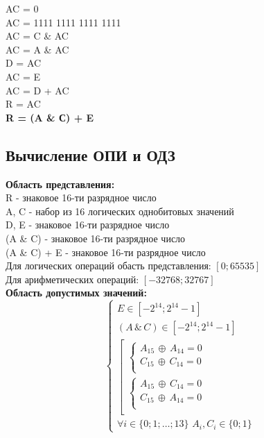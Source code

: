 \noindent AC = 0 \\
AC = 1111 1111 1111 1111 \\
AC = C \& AC \\
AC = A \& AC \\
D = AC \\
AC = E \\
AC = D + AC \\
R = AC \\

\noindent \textbf{R = (A \& С) + E}
\subsection{Вычисление ОПИ и ОДЗ}
\textbf{Область представления:} \\
R - знаковое 16-ти разрядное число \\
A, C - набор из 16 логических однобитовых значений \\
D, E - знаковое 16-ти разрядное число \\
(A \& C) - знаковое 16-ти разрядное число \\
(A \& C) + E - знаковое 16-ти разрядное число \\
Для логических операций обасть представления: \( [0; 65535] \) \\
Для арифметических операций: \( [-32768; 32767] \) \\

\noindent \textbf{Область допустимых значений:} \\
\[
\begin{cases}
E \in [-2^{14}; 2^{14} - 1] \\
(A\, \& \,C) \in [-2^{14}; 2^{14} - 1] \\
\left[
\begin{array}{l}
\begin{cases}
A_{15}\, \oplus \, A_{14} = 0 \\
C_{15}\, \oplus \, C_{14} = 0 \\
\end{cases} \\
\begin{cases}
A_{15}\, \oplus \, C_{14} = 0 \\
C_{15}\, \oplus \, A_{14} = 0 \\
\end{cases} \\
\end{array}
\right. \\

\forall i \in \{0; 1; \dots; 13\}\,\, A_{i}, C_{i} \in \{0; 1\}
\end{cases}
\]

